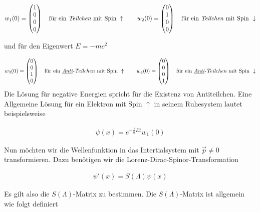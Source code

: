 \begin{align}
  \label{eq:8}
  w_1(0) =
  \begin{pmatrix}
    1\\0\\0\\0
  \end{pmatrix}\quad \text{für ein \textit{Teilchen} mit Spin } \uparrow
\qquad 
 w_2(0) =
  \begin{pmatrix}
    0\\1\\0\\0
  \end{pmatrix}\quad \text{für ein \textit{Teilchen} mit Spin } \downarrow
\end{align}

und für den Eigenwert \(E=-mc^2\)

\begin{align}
  \label{eq:9}
   w_3(0) =
  \begin{pmatrix}
    0\\0\\1\\0
  \end{pmatrix}\quad \text{für ein \textit{\underline{Anti}-Teilchen} mit Spin } \uparrow
\qquad 
 w_4(0) =
  \begin{pmatrix}
    0\\0\\0\\1
  \end{pmatrix}\quad \text{für ein \textit{\underline{Anti}-Teilchen} mit Spin } \downarrow
\end{align}
Die Lösung für negative Energien spricht für die Existenz von Antiteilchen. Eine Allgemeine Lösung für ein Elektron mit Spin \(\uparrow\) in seinem Ruhesystem lautet beispielsweise

\begin{align}
  \label{eq:10}
  \psi(x) = e^{-\frac{i}{\hbar}Et  }w_1(0)
\end{align}

Nun möchten wir die Wellenfunktion in das Intertialsystem mit \(\vec p\ne 0\) transformieren. Dazu benötigen wir die Lorenz-Dirac-Spinor-Transformation 

\begin{align}
  \label{eq:11}
  \psi'(x) = S(\Lambda)\psi(x)
\end{align}

Es gilt also die \(S(\Lambda)\)-Matrix zu bestimmen. Die \(S(\Lambda)\)-Matrix ist allgemein wie folgt definiert

